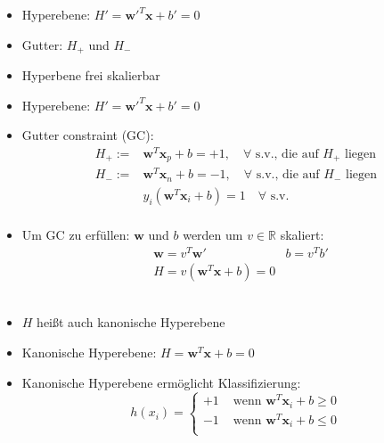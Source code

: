 \begin{frame}
     {
        \begin{itemize}
            \item Hyperebene: $ H' = \boldsymbol{w}'^T \boldsymbol{x} + b' = 0 $
            \item Gutter: $H_+$ und $H_-$
            \item Hyperbene frei skalierbar
        \end{itemize}
    } {
        \begin{itemize}
            \item Hyperebene: $ H' = \boldsymbol{w}'^T \boldsymbol{x} + b' = 0 $
            \item Gutter constraint (GC):
                \begin{align*}
                    H_+ := & \boldsymbol{w}^T \boldsymbol{x}_p + b = +1, \quad \forall \text{ s.v., die auf } H_+ \text{ liegen} \\
                    H_- := & \boldsymbol{w}^T \boldsymbol{x}_n + b = -1, \quad \forall \text{ s.v., die auf } H_- \text{ liegen} \\
                    & y_i ( \boldsymbol{w}^T \boldsymbol{x}_i + b ) = 1 \quad \forall \text{ s.v. } \\
                \end{align*}
            \item Um GC zu erfüllen: $ \boldsymbol{w} $ und $b$ werden um $ v \in \mathbb{R} $ skaliert:
                \begin{align*}
                    & \boldsymbol{w} = v^T \boldsymbol{w}' & b = v^T b' \\
                    & H = v ( \boldsymbol{w}^T \boldsymbol{x} + b ) = 0
                \end{align*} \\
            \item $H$ heißt auch kanonische Hyperebene
        \end{itemize}
    } {
        \begin{itemize}
            \item Kanonische Hyperebene: $ H = \boldsymbol{w}^T \boldsymbol{x} + b = 0 $
            \item Kanonische Hyperebene ermöglicht Klassifizierung:
                \begin{equation*}
                    h(x_i) = \begin{cases}
                        +1 & \text{ wenn } \boldsymbol{w}^T \boldsymbol{x}_i + b \geq 0 \\
                        -1 & \text{ wenn } \boldsymbol{w}^T \boldsymbol{x}_i + b \leq 0 \\
                    \end{cases}
                \end{equation*}
        \end{itemize}
    }
\end{frame}

